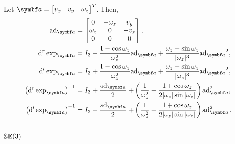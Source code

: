 \begin{properties}[title={Lowercase adjoint and exponential derivatives on $\SEtwo$}]
  Let $\a =\begin{bmatrix} v_x & v_y & \omega_z \end{bmatrix}^T$. Then,
  \begin{align}
    \ad_\a                                     & =  \begin{bmatrix}  0 & -\omega_z & v_y \\ \omega_z & 0 & -v_x \\ 0 & 0 & 0 \end{bmatrix},                                                                                                     \\
    \mathrm{d}^r \exp_{\a}                     & =        I_3 - \frac{1 - \cos \omega_z}{\omega_z^2} {\ad_\a} + \frac{ \omega_z - \sin \omega_z }{|\omega_z|^3} {\ad_\a}^2,         \\
    \mathrm{d}^l \exp_{\a}                     & = I_3 + \frac{1 - \cos \omega_z}{\omega_z^2} {\ad_\a} + \frac{ \omega_z - \sin \omega_z }{|\omega_z|^3} {\ad_\a}^2,                \\
    \left( \mathrm{d}^r \exp_{\a} \right)^{-1} & = I_3 + \frac{\ad_\a}{2} + \left( \frac{1}{\omega_z^2} - \frac{1 + \cos \omega_z }{2 |\omega_z| \sin |\omega_z|} \right) \ad_\a^2, \\
    \left( \mathrm{d}^l \exp_{\a} \right)^{-1} & = I_3 - \frac{\ad_\a}{2} + \left( \frac{1}{\omega_z^2} - \frac{1 + \cos \omega_z }{2 |\omega_z| \sin |\omega_z|} \right) \ad_\a^2.
  \end{align}
\end{properties}

\subsection{\texorpdfstring{${\mathbb{SE}(3)}$}{SE(3)}}

